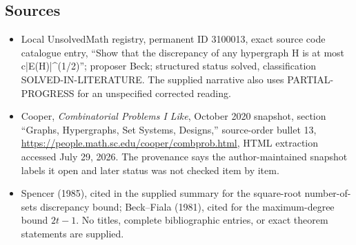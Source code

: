 \documentclass[11pt]{article}
\begin{document}
\subsection{Sources}
\begin{itemize}
\item Local UnsolvedMath registry, permanent ID 3100013, exact source code catalogue entry, ``Show that the discrepancy of any hypergraph H is at most c|E(H)|\^{}(1/2)''; proposer Beck; structured status solved, classification SOLVED-IN-LITERATURE. The supplied narrative also uses PARTIAL-PROGRESS for an unspecified corrected reading.
\item Cooper, \emph{Combinatorial Problems I Like}, October 2020 snapshot, section ``Graphs, Hypergraphs, Set Systems, Designs,'' source-order bullet 13, \url{https://people.math.sc.edu/cooper/combprob.html}, HTML extraction accessed July 29, 2026. The provenance says the author-maintained snapshot labels it open and later status was not checked item by item.
\item Spencer (1985), cited in the supplied summary for the square-root number-of-sets discrepancy bound; Beck--Fiala (1981), cited for the maximum-degree bound $2t-1$. No titles, complete bibliographic entries, or exact theorem statements are supplied.
\end{itemize}
\end{document}
